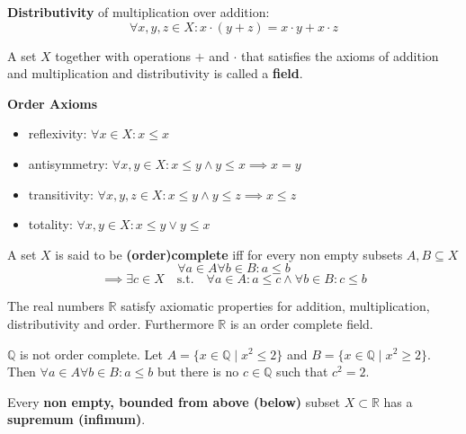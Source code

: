 \begin{definition}
    \textbf{Distributivity} of multiplication over addition:
    $$\forall x, y, z \in X: x \cdot (y + z) = x \cdot y + x \cdot z$$
\end{definition}

\begin{remark}
    A set $X$ together with operations $+$ and $\cdot$ that satisfies the axioms of addition and multiplication and distributivity is called a \textbf{field}.
\end{remark}

\begin{definition}
    \textbf{Order Axioms}
    \begin{itemize}
        \item reflexivity: $\forall x \in X: x \leq x$
        \item antisymmetry: $\forall x, y \in X: x \leq y \land y \leq x \implies x = y$
        \item transitivity: $\forall x, y, z \in X: x \leq y \land y \leq z \implies x \leq z$
        \item totality: $\forall x, y \in X: x \leq y \lor y \leq x$
    \end{itemize}
\end{definition}

\begin{definition}
    A set $X$ is said to be \textbf{(order)complete} iff for every non empty subsets $A, B \subseteq X$
    $$\forall a \in A \forall b \in B: a \leq b$$
    $$\implies \exists c \in X \quad \text{s.t.} \quad \forall a \in A: a \leq c \land \forall b \in B: c \leq b$$
\end{definition}

\begin{example}
    The real numbers $\mathbb{R}$ satisfy axiomatic properties for addition, multiplication, distributivity and order. Furthermore $\mathbb{R}$ is an order complete field.
\end{example}

\begin{example}
    $\mathbb{Q}$ is not order complete. Let $A = \{x \in \mathbb{Q} \mid x^2 \leq 2\}$ and $B = \{x \in \mathbb{Q} \mid x^2 \geq 2\}$. Then $\forall a \in A \forall b \in B: a \leq b$ but there is no $c \in \mathbb{Q}$ such that $c^2 = 2$.
\end{example}

\begin{theorem}
    Every \textbf{non empty, bounded from above (below)} subset $X \subset \mathbb{R}$ has a \textbf{supremum (infimum)}.
\end{theorem}

